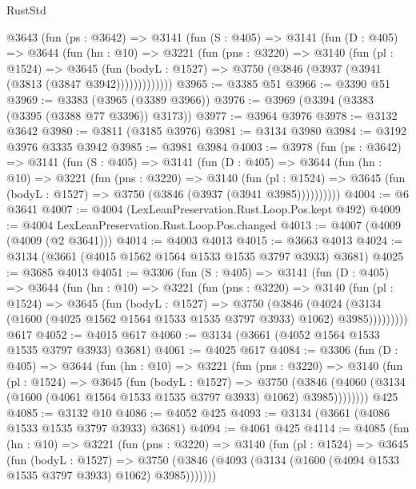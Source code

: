 \begin{lexlean}{RustStd}
\begin{coremodule}
    @3643
      (fun (ps : @3642) =>
      @3141
        (fun (S : @405) =>
        @3141
          (fun (D : @405) =>
          @3644
            (fun (hn : @10) =>
            @3221
              (fun (pns : @3220) =>
              @3140
                (fun (pl : @1524) =>
                @3645
                  (fun (bodyL : @1527) =>
                  @3750 (@3846 (@3937 (@3941 (@3813 (@3847 @3942)))))))))))))
@3965 := @3385 @51
@3966 := @3390 @51
@3969 := @3383 (@3965 (@3389 @3966))
@3976 := @3969 (@3394 (@3383 (@3395 (@3388 @77 @3396)) @3173))
@3977 := @3964 @3976
@3978 := @3132 @3642
@3980 := @3811 (@3185 @3976)
@3981 := @3134 @3980
@3984 := @3192 @3976 @3335 @3942
@3985 := @3981 @3984
@4003 := @3978
    (fun (ps : @3642) =>
    @3141
      (fun (S : @405) =>
      @3141
        (fun (D : @405) =>
        @3644
          (fun (hn : @10) =>
          @3221
            (fun (pns : @3220) =>
            @3140
              (fun (pl : @1524) =>
              @3645 (fun (bodyL : @1527) => @3750 (@3846 (@3937 (@3941 @3985))))))))))
@4004 := @6 @3641
@4007 := @4004 (LexLeanPreservation.Rust.Loop.Pos.kept @492)
@4009 := @4004 LexLeanPreservation.Rust.Loop.Pos.changed
@4013 := @4007 (@4009 (@4009 (@2 @3641)))
@4014 := @4003 @4013
@4015 := @3663 @4013
@4024 := @3134 (@3661 (@4015 @1562 @1564 @1533 @1535 @3797 @3933) @3681)
@4025 := @3685 @4013
@4051 := @3306
    (fun (S : @405) =>
    @3141
      (fun (D : @405) =>
      @3644
        (fun (hn : @10) =>
        @3221
          (fun (pns : @3220) =>
          @3140
            (fun (pl : @1524) =>
            @3645
              (fun (bodyL : @1527) =>
              @3750
                (@3846
                  (@4024
                    (@3134 (@1600 (@4025 @1562 @1564 @1533 @1535 @3797 @3933) @1062) @3985)))))))))
    @617
@4052 := @4015 @617
@4060 := @3134 (@3661 (@4052 @1564 @1533 @1535 @3797 @3933) @3681)
@4061 := @4025 @617
@4084 := @3306
    (fun (D : @405) =>
    @3644
      (fun (hn : @10) =>
      @3221
        (fun (pns : @3220) =>
        @3140
          (fun (pl : @1524) =>
          @3645
            (fun (bodyL : @1527) =>
            @3750
              (@3846 (@4060 (@3134 (@1600 (@4061 @1564 @1533 @1535 @3797 @3933) @1062) @3985))))))))
    @425
@4085 := @3132 @10
@4086 := @4052 @425
@4093 := @3134 (@3661 (@4086 @1533 @1535 @3797 @3933) @3681)
@4094 := @4061 @425
@4114 := @4085
    (fun (hn : @10) =>
    @3221
      (fun (pns : @3220) =>
      @3140
        (fun (pl : @1524) =>
        @3645
          (fun (bodyL : @1527) =>
          @3750 (@3846 (@4093 (@3134 (@1600 (@4094 @1533 @1535 @3797 @3933) @1062) @3985)))))))

\end{coremodule}
\end{lexlean}

